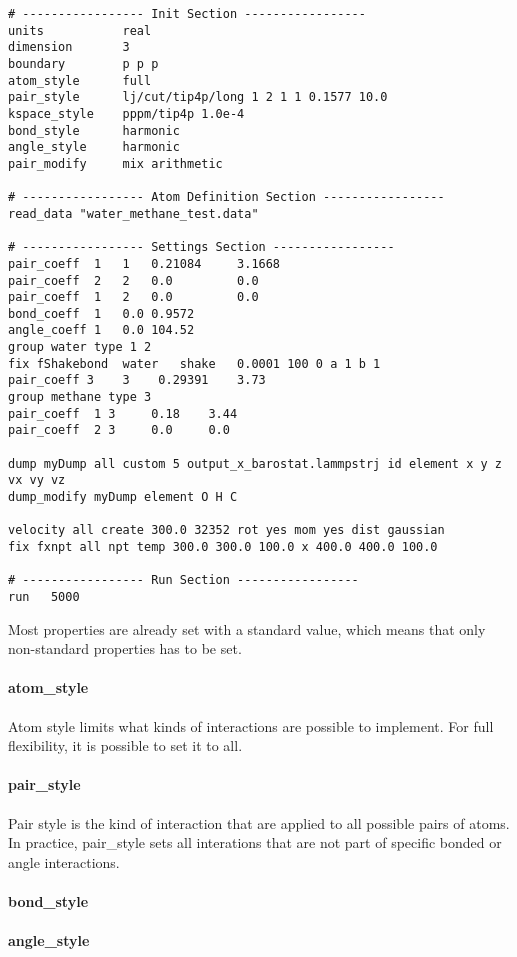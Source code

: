 \begin{lstlisting}[language=LammpsInput]
# ----------------- Init Section -----------------
units 			real
dimension 		3
boundary		p p p 
atom_style		full
pair_style		lj/cut/tip4p/long 1 2 1 1 0.1577 10.0
kspace_style	pppm/tip4p 1.0e-4
bond_style 		harmonic
angle_style		harmonic
pair_modify		mix arithmetic

# ----------------- Atom Definition Section -----------------
read_data "water_methane_test.data"

# ----------------- Settings Section -----------------
pair_coeff	1 	1 	0.21084 	3.1668
pair_coeff	2 	2	0.0 		0.0
pair_coeff	1 	2 	0.0 		0.0
bond_coeff  1 	0.0 0.9572
angle_coeff 1 	0.0 104.52
group water type 1 2
fix	fShakebond	water 	shake 	0.0001 100 0 a 1 b 1
pair_coeff 3 	3 	 0.29391 	3.73
group methane type 3
pair_coeff 	1 3 	0.18 	3.44
pair_coeff 	2 3 	0.0 	0.0

dump myDump all custom 5 output_x_barostat.lammpstrj id element x y z vx vy vz
dump_modify myDump element O H C

velocity all create 300.0 32352 rot yes mom yes dist gaussian
fix fxnpt all npt temp 300.0 300.0 100.0 x 400.0 400.0 100.0

# ----------------- Run Section -----------------
run   5000
\end{lstlisting}

Most properties are already set with a standard value, which means that only non-standard properties has to be set. 

\paragraph{atom\_style}
Atom style limits what kinds of interactions are possible to implement. For full flexibility, it is possible to set it to all.

\paragraph{pair\_style}
Pair style is the kind of interaction that are applied to all possible pairs of atoms. In practice, pair\_style sets all interations that are not part of specific bonded or angle interactions. 

\paragraph{bond\_style}

\paragraph{angle\_style}

